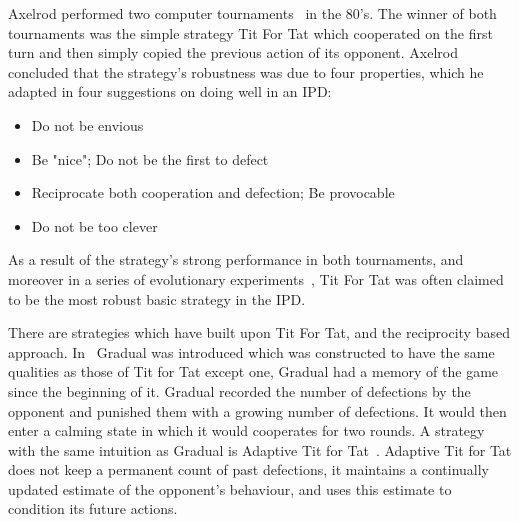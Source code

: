 \documentclass{article}
\begin{document}
Axelrod performed two computer tournaments~\cite{Axelrod1980a,
Axelrod1980b} in the 80's. The
winner of both tournaments was the simple strategy Tit For Tat which cooperated
on the first turn and then simply copied the previous action of its opponent.
Axelrod concluded that the strategy's robustness was due to four properties, which
he adapted in four suggestions on doing well in an IPD:

\begin{itemize}
    \item Do not be envious
    \item Be "nice"; Do not be the first to defect
    \item Reciprocate both cooperation and defection; Be provocable
    \item Do not be too clever
\end{itemize}

As a result of the strategy's strong performance in both tournaments, and moreover in a
series of evolutionary experiments~\cite{Axelrod1981}, Tit For Tat was often
claimed to be the most robust basic strategy in the IPD.

There are strategies which have built upon Tit For Tat, and the reciprocity based approach.
In~\cite{Beaufils1997} Gradual was introduced which was constructed to have the
same qualities as those of Tit for Tat except one, Gradual had a memory
of the game since the beginning of it. Gradual recorded the number of defections
by the opponent and punished them with a growing number of defections. It would
then enter a calming state in which it would cooperates for two rounds. A
strategy with the same intuition as Gradual is Adaptive Tit for
Tat~\cite{tzafestas-2000a}. Adaptive Tit for Tat does not keep a permanent
count of past defections, it maintains a continually updated estimate of the
opponent's behaviour, and uses this estimate to condition its future actions.
\end{document}

